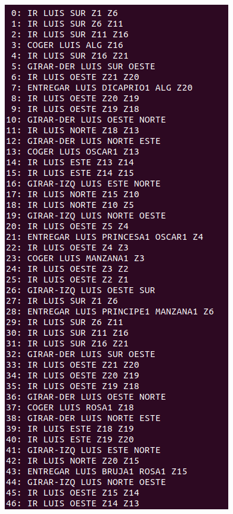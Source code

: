 \begin{figure}[H]
	\begin{minipage}[b]{0.5\linewidth}
		\centering
		\includegraphics[width=\linewidth]{ej1-1.png}

\end{minipage}
\end{figure}
